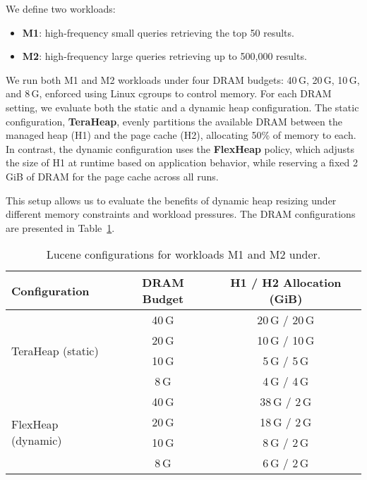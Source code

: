 We define two workloads:
\begin{itemize}[leftmargin=1.5em]
  \item \textbf{M1}: high-frequency small queries retrieving the top 50 results.
  \item \textbf{M2}: high-frequency large queries retrieving up to 500{,}000 results.
\end{itemize}

We run both M1 and M2 workloads under four DRAM budgets: 40\,G, 20\,G, 10\,G, and 8\,G,
enforced using Linux cgroups to control memory. 
For each DRAM setting, we evaluate both the static and a dynamic heap configuration. 
The static configuration, \textbf{TeraHeap}, evenly partitions the available DRAM between the 
managed heap (H1) and the page cache (H2), allocating 50\% of memory to each. In contrast, 
the dynamic configuration uses the \textbf{FlexHeap} policy, which adjusts the size of H1 
at runtime based on application behavior, while reserving a fixed 2\,GiB of DRAM for the page cache across all runs.

This setup allows us to evaluate the benefits of dynamic heap resizing under different memory constraints and workload pressures. 
The DRAM configurations are presented in Table~\ref{tab:lucene-configs}.
\begin{table}[H]
\centering
\renewcommand{\arraystretch}{1.3}
\caption{Lucene configurations for workloads M1 and M2 under.}
\label{tab:lucene-configs}
\begin{tabular}{|l|c|c|}
\hline
\textbf{Configuration} & \textbf{DRAM Budget} & \textbf{H1 / H2 Allocation (GiB)} \\
\hline
\multirow{4}{*}{TeraHeap (static)} 
                       & 40\,G             & 20\,G / 20\,G \\
                       & 20\,G             & 10\,G / 10\,G \\
                       & 10\,G             & 5\,G / 5\,G   \\
                       & 8\,G              & 4\,G / 4\,G   \\
\hline
\multirow{4}{*}{FlexHeap (dynamic)} 
                       & 40\,G             & 38\,G / 2\,G  \\
                       & 20\,G             & 18\,G / 2\,G  \\
                       & 10\,G             & 8\,G / 2\,G   \\
                       & 8\,G              & 6\,G / 2\,G   \\
\hline
\end{tabular}
\end{table}

